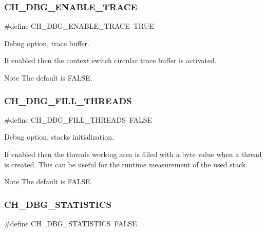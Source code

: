 \subsubsection{\texorpdfstring{C\+H\+\_\+\+D\+B\+G\+\_\+\+E\+N\+A\+B\+L\+E\+\_\+\+T\+R\+A\+CE}{CH\_DBG\_ENABLE\_TRACE}}
{\footnotesize\ttfamily \#define C\+H\+\_\+\+D\+B\+G\+\_\+\+E\+N\+A\+B\+L\+E\+\_\+\+T\+R\+A\+CE~T\+R\+UE}



Debug option, trace buffer. 

If enabled then the context switch circular trace buffer is activated.

\begin{DoxyNote}{Note}
The default is {\ttfamily F\+A\+L\+SE}. 
\end{DoxyNote}
\hypertarget{group__config_ga6a859dd249adfb66b9bbf809061ea06c}{}\label{group__config_ga6a859dd249adfb66b9bbf809061ea06c} 
\subsubsection{\texorpdfstring{C\+H\+\_\+\+D\+B\+G\+\_\+\+F\+I\+L\+L\+\_\+\+T\+H\+R\+E\+A\+DS}{CH\_DBG\_FILL\_THREADS}}
{\footnotesize\ttfamily \#define C\+H\+\_\+\+D\+B\+G\+\_\+\+F\+I\+L\+L\+\_\+\+T\+H\+R\+E\+A\+DS~F\+A\+L\+SE}



Debug option, stacks initialization. 

If enabled then the threads working area is filled with a byte value when a thread is created. This can be useful for the runtime measurement of the used stack.

\begin{DoxyNote}{Note}
The default is {\ttfamily F\+A\+L\+SE}. 
\end{DoxyNote}
\hypertarget{group__config_ga01fa48cf866c26bad886a15c37571f99}{}\label{group__config_ga01fa48cf866c26bad886a15c37571f99} 
\subsubsection{\texorpdfstring{C\+H\+\_\+\+D\+B\+G\+\_\+\+S\+T\+A\+T\+I\+S\+T\+I\+CS}{CH\_DBG\_STATISTICS}}
{\footnotesize\ttfamily \#define C\+H\+\_\+\+D\+B\+G\+\_\+\+S\+T\+A\+T\+I\+S\+T\+I\+CS~F\+A\+L\+SE}



